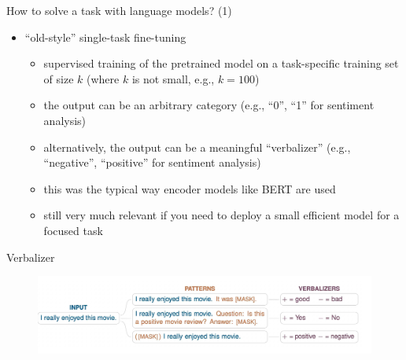 \begin{frame}{How to solve a task with language models? (1)}

\vfill

\begin{itemize}
    \item ``old-style'' single-task fine-tuning 
        \begin{itemize}
            \item supervised training
of the pretrained model
on a task-specific
        training set of size $k$ (where $k$ is not small,
        e.g., $k=100$)
        \item the output can be an arbitrary category (e.g.,
        ``0'', ``1'' for sentiment analysis)
            \item alternatively, the output can be a
        meaningful ``verbalizer'' (e.g., ``negative'',
        ``positive'' for sentiment analysis)
        \item this was the typical way encoder models like
        BERT are used
        \item still very much relevant if you need to deploy
        a small efficient model for a focused task
        \end{itemize}
\end{itemize}

\vfill

\end{frame}




\begin{frame}{Verbalizer}

\vfill
	
	\begin{figure}
		\centering
		\includegraphics[width = 12cm]{figure/schickverbalizer} 
	\end{figure}

\vfill

\end{frame}








